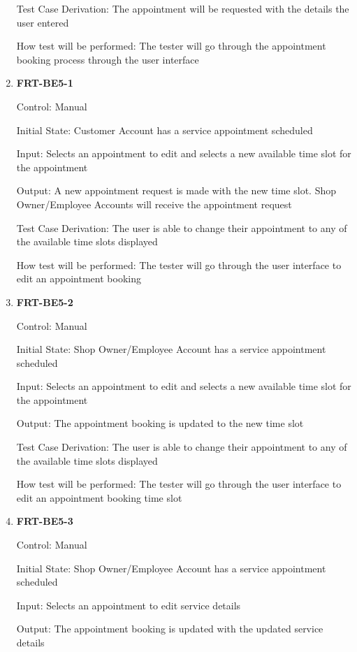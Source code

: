 \documentclass[12pt, titlepage]{article}
\begin{document}
\begin{enumerate}
	      Test Case Derivation: The appointment will be requested with the details the user entered

	      How test will be performed: The tester will go through the appointment booking process through the
	      user interface

	\item \textbf{FRT-BE5-1}

	      Control: Manual

	      Initial State: Customer Account has a service appointment scheduled

	      Input: Selects an appointment to edit and selects a new available time slot for the appointment

	      Output: A new appointment request is made with the new time slot. Shop Owner/Employee Accounts will
	      receive the appointment request

	      Test Case Derivation: The user is able to change their appointment to any of the available time
	      slots displayed

	      How test will be performed: The tester will go through the user interface to edit an appointment
	      booking

	\item \textbf{FRT-BE5-2}

	      Control: Manual

	      Initial State: Shop Owner/Employee Account has a service appointment scheduled

	      Input: Selects an appointment to edit and selects a new available time slot for the appointment

	      Output: The appointment booking is updated to the new time slot

	      Test Case Derivation: The user is able to change their appointment to any of the available time
	      slots displayed

	      How test will be performed: The tester will go through the user interface to edit an appointment
	      booking time slot

	\item \textbf{FRT-BE5-3}

	      Control: Manual

	      Initial State: Shop Owner/Employee Account has a service appointment scheduled

	      Input: Selects an appointment to edit service details

	      Output: The appointment booking is updated with the updated service details


\end{enumerate}
\end{document}
